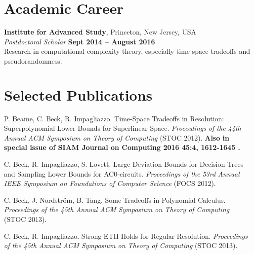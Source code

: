 \documentclass[margin,line]{resume}
\begin{document}
\begin{resume}

\section{\mysidestyle Academic Career}

    \textbf{Institute for Advanced Study}, Princeton, New Jersey, USA \vspace{2mm}\\\vspace{1mm}%
    \textsl{Postdoctoral Scholar} \hfill \textbf{Sept 2014 -- August 2016}\\
    Research in computational complexity theory, especially time space tradeoffs and pseudorandomness.

    \section{\mysidestyle Selected Publications}

    P. Beame, C. Beck, R. Impagliazzo. Time-Space Tradeoffs in Resolution: Superpolynomial Lower Bounds for Superlinear Space. \textsl{Proceedings of the 44th Annual ACM Symposium on Theory of Computing } (STOC 2012). {\bf Also in special issue of SIAM Journal on Computing 2016 45:4, 1612-1645 .}

\vspace{-2mm}
    C. Beck, R. Impagliazzo, S. Lovett. Large Deviation Bounds for Decision Trees and Sampling Lower Bounds for AC0-circuits. \textsl{Proceedings of the 53rd Annual IEEE Symposium on Foundations of Computer Science} (FOCS 2012). 

\vspace{-2mm}
    C. Beck, J. Nordstr{\"o}m, B. Tang. Some Tradeoffs in Polynomial Calculus. 
    \textsl{Proceedings of the 45th Annual ACM Symposium on Theory of Computing } (STOC 2013).
    

\vspace{-2mm}
    C. Beck, R. Impagliazzo. Strong ETH Holds for Regular Resolution.
    \textsl{Proceedings of the 45th Annual ACM Symposium on Theory of Computing } (STOC 2013).






\end{resume}
\end{document}
